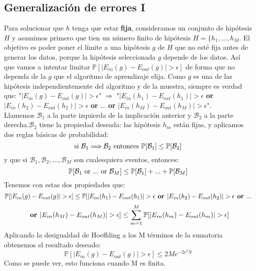 \subsection{Generalización de errores I}
Para solucionar que $h$ tenga que estar \textbf{fija}, consideramos un conjunto de hipótesis $H$ y asumimos primero que tien un número finito de hipótesis $H=\lbrace h_{1},...,h_{M}$. El objetivo es poder poner el límite a una hipótesis $g$ de $H$ que no esté fija antes de generar los datos, porque la hipótesis seleccionada $g$ depende de los datos. Así que vamos a intentar limitar $\mathbb{P}[\vert E_{in}(g)-E_{out}(g) \vert > \epsilon]$ de forma que no dependa de la $g$ que el algoritmo de aprendizaje elija. Como $g$ es una de las hipótesis independientemente del algoritmo y de la muestra, siempre es verdad que:
"$\vert E_{in}(g)-E_{out}(g) \vert > \epsilon$" $\Longrightarrow$ "$\vert E_{in}(h_{1})-E_{out}(h_{1}) \vert > \epsilon$ \textbf{or} $\vert E_{in}(h_{2})-E_{out}(h_{2}) \vert > \epsilon$ \textbf{or} ... \textbf{or} $\vert E_{in}(h_{M})-E_{out}(h_{M}) \vert > \epsilon$".\\
Llamemos $\mathcal{B}_{1}$ a la parte izquierda de la implicación anterior y $\mathcal{B}_{2}$ a la parte derecha.$\mathcal{B}_{2}$ tiene la propiedad deseada: las hipótesis $h_{m}$ están fijas, y aplicamos dos reglas básicas de probabilidad:
\[ \textnormal{si } \mathcal{B}_{1} \Longrightarrow \mathcal{B}_{2} \textnormal{ entonces } \mathbb{P}[\mathcal{B}_{1}] \leq \mathbb{P}[\mathcal{B}_{2}]\]
y que si $\mathcal{B}_{1},\mathcal{B}_{2},...,\mathcal{B}_{M}$ son cualesquiera eventos, entonces:
\[ \mathbb{P}[\mathcal{B}_{1} \textnormal{ or } ... \textnormal{ or } \mathcal{B}_{M}] \leq \mathbb{P}[\mathcal{B}_{1}]+...+\mathbb{P}[\mathcal{B}_{M}] \]
Tenemos con estas dos propiedades que:
\[ \mathbb{P}[\vert E_{in}(g)-E_{out}(g) \vert > \epsilon] \leq \mathbb{P}[\vert E_{in}(h_{1})-E_{out}(h_{1}) \vert > \epsilon \textnormal{\textbf{ or }} \vert E_{in}(h_{2})-E_{out}(h_{2}) \vert > \epsilon \textnormal{\textbf{ or }} ...\]
\[\textnormal{\textbf{ or }} \vert E_{in}(h_{M})-E_{out}(h_{M}) \vert > \epsilon] \leq \sum_{m=1}^{M}\mathbb{P}[\vert E_{in}(h_{m})-E_{out}(h_{m}) \vert > \epsilon] \]
Aplicando la desigualdad de Hoeffding a los M términos de la sumatoria obtenemos el resultado deseado:
\[ \mathbb{P}[\vert E_{in}(g)-E_{out}(g) \vert > \epsilon] \leq 2Me^{-2\epsilon^{2}N} \]
Como se puede ver, esto funciona cuando M es finita. \cite{abu2012learning}
